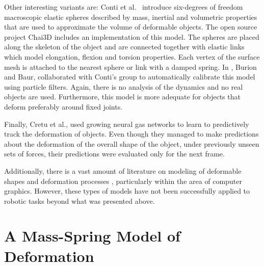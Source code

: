 \documentclass[journal]{IEEEtran}
\begin{document}
Other interesting variants are: Conti et al.\ \cite{Conti2003} introduce six-degrees of freedom macroscopic elastic spheres described by mass, inertial and volumetric properties that are used to approximate the volume of deformable objects. The open source project Chai3D includes an implementation of this model. The spheres are placed along the skeleton of the object and are connected together with elastic links which model elongation, flexion and torsion properties. Each vertex of the surface mesh is attached to the nearest sphere or link with a damped spring.  In \cite{Burion2008}, Burion and Baur, collaborated with Conti's group to automatically calibrate this model using particle filters.  Again, there is no analysis of the dynamics and no real objects are used.  Furthermore, this model is more adequate for objects that deform preferably around fixed joints.

Finally, Cretu et al., used growing neural gas networks to learn to predictively track the deformation of objects.  Even though they managed to make predictions about the deformation of the overall shape of the object, under previously unseen sets of forces, their predictions were evaluated only for the next frame.

Additionally, there is a vast amount of literature on modeling of deformable shapes and deformation processes \cite{Gibson1997, McInerney1996, Montagnat2001, Moore2007review, Nealen2006review}, particularly within the area of computer graphics.  However, these types of models have not been successfully applied to robotic tasks beyond what was presented above.


\section{A Mass-Spring Model of Deformation}
\end{document}
